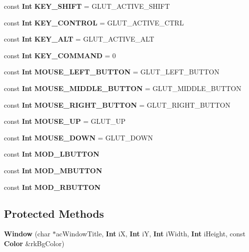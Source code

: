 \begin{CompactItemize}
\item 
const {\bf Int} {\bf KEY\_\-SHIFT} = GLUT\_\-ACTIVE\_\-SHIFT
\item 
const {\bf Int} {\bf KEY\_\-CONTROL} = GLUT\_\-ACTIVE\_\-CTRL
\item 
const {\bf Int} {\bf KEY\_\-ALT} = GLUT\_\-ACTIVE\_\-ALT
\item 
const {\bf Int} {\bf KEY\_\-COMMAND} = 0
\item 
const {\bf Int} {\bf MOUSE\_\-LEFT\_\-BUTTON} = GLUT\_\-LEFT\_\-BUTTON
\item 
const {\bf Int} {\bf MOUSE\_\-MIDDLE\_\-BUTTON} = GLUT\_\-MIDDLE\_\-BUTTON
\item 
const {\bf Int} {\bf MOUSE\_\-RIGHT\_\-BUTTON} = GLUT\_\-RIGHT\_\-BUTTON
\item 
const {\bf Int} {\bf MOUSE\_\-UP} = GLUT\_\-UP
\item 
const {\bf Int} {\bf MOUSE\_\-DOWN} = GLUT\_\-DOWN
\item 
const {\bf Int} {\bf MOD\_\-LBUTTON}
\item 
const {\bf Int} {\bf MOD\_\-MBUTTON}
\item 
const {\bf Int} {\bf MOD\_\-RBUTTON}
\end{CompactItemize}
\subsection*{Protected Methods}
\begin{CompactItemize}
\item 
{\bf Window} (char $\ast$ac\-Window\-Title, {\bf Int} i\-X, {\bf Int} i\-Y, {\bf Int} i\-Width, {\bf Int} i\-Height, const {\bf Color} \&rk\-Bg\-Color)
\end{CompactItemize}
